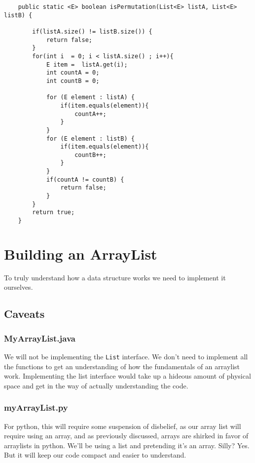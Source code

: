 \begin{verbatim}
	public static <E> boolean isPermutation(List<E> listA, List<E> listB) {
		
		if(listA.size() != listB.size()) {
			return false;
		}
		for(int i  = 0; i < listA.size() ; i++){
			E item =  listA.get(i);
			int countA = 0;
			int countB = 0;
			
			for (E element : listA) {
				if(item.equals(element)){
					countA++;
				}
			}
			for (E element : listB) {
				if(item.equals(element)){
					countB++;
				}
			}
			if(countA != countB) {
				return false;
			}
		}
		return true;
	}
\end{verbatim}



\section{Building an ArrayList}
\label{buildingArraylist}
To truly understand how a data structure works we need to implement it ourselves.

\subsection{Caveats}

\subsubsection{MyArrayList.java}
We will not be implementing the \texttt{List} interface. We don't need to implement all the functions to get an understanding of how the fundamentals of an arraylist work.
Implementing the list interface would take up a hideous amount of physical space and get in the way of actually understanding the code.



\subsubsection{myArrayList.py}

For python, this will require some suspension of disbelief, as our array list will require using an array, and as previously discussed, arrays are shirked in favor of arraylists in python.  We'll be using a list and pretending it's an array. Silly?  Yes.  But it will keep our code compact and easier to understand.



